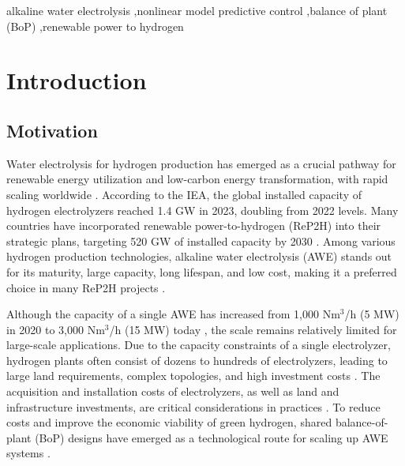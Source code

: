 \documentclass[review,3p,10pt]{elsarticle}
\begin{document}
\begin{frontmatter}
\begin{keyword}
    alkaline water electrolysis %
    \sep  nonlinear model predictive control %
    \sep  balance of plant (BoP)
    \sep  renewable power to hydrogen
\end{keyword}

\end{frontmatter}

\section{Introduction}
\label{sec:intro}

\subsection{Motivation}
\label{sec:motivation}

Water electrolysis for hydrogen production has emerged as a crucial pathway for renewable energy utilization and low-carbon energy transformation, with rapid scaling worldwide \cite{hosseini2022hydrogen}. According to the IEA, the global installed capacity of hydrogen electrolyzers reached 1.4 GW in 2023, doubling from 2022 levels. %
Many countries have incorporated renewable power-to-hydrogen (ReP2H) into their strategic plans, targeting 520 GW of installed capacity by 2030 \cite{IEA2024Global}. Among various hydrogen production technologies, alkaline water electrolysis (AWE) stands out for its maturity, large capacity, long lifespan, and low cost, making it a preferred choice in many ReP2H projects \cite{emam2024review}.

Although the capacity of a single AWE has increased from 1,000 Nm$^3$/h (5 MW) in 2020 to 3,000 Nm$^3$/h (15 MW) today \cite{emam2024review}, the scale remains relatively limited for large-scale applications. Due to the capacity constraints of a single electrolyzer, hydrogen plants often consist of dozens to hundreds of electrolyzers, leading to large land requirements, complex topologies, and high investment costs \cite{emam2024review}. The acquisition and installation costs of electrolyzers, as well as land and infrastructure investments, are critical considerations in practices \cite{lange2024modularization,niblett2024review}. To reduce costs and improve the economic viability of green hydrogen, shared balance-of-plant (BoP) designs have emerged as a technological route for scaling up AWE systems \cite{lange2024modularization,niblett2024review,chi2024elevating,zhang2024optimizing,yang2022application,rizwan2021design,chen2024enhancing,shi2023plant}.
\end{document}
